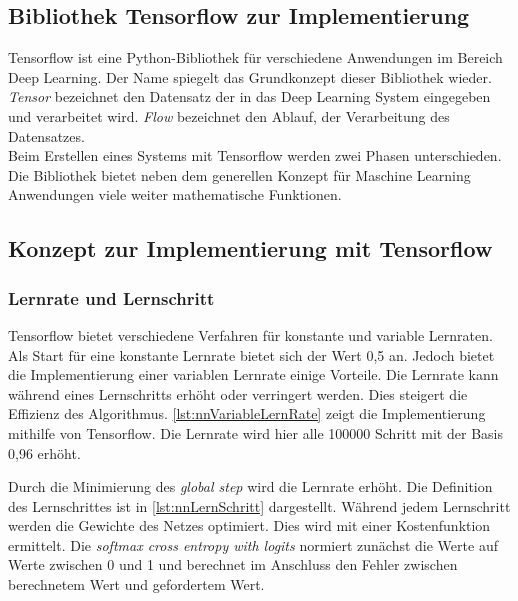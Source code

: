 \subsection{Bibliothek Tensorflow zur Implementierung}
Tensorflow ist eine Python-Bibliothek für verschiedene Anwendungen im Bereich Deep Learning. 
Der Name spiegelt das Grundkonzept dieser Bibliothek wieder. 
\textit{Tensor} bezeichnet den Datensatz der in das Deep Learning System 
eingegeben und verarbeitet wird. \textit{Flow} bezeichnet den Ablauf, 
der Verarbeitung des Datensatzes. \\
Beim Erstellen eines Systems mit Tensorflow werden zwei Phasen 
unterschieden. 
Die Bibliothek bietet neben dem generellen Konzept für Maschine Learning Anwendungen 
viele weiter mathematische Funktionen. 
\cite{tf:2018}

\subsection{Konzept zur Implementierung mit Tensorflow}
\subsubsection{Lernrate und Lernschritt}
Tensorflow bietet verschiedene Verfahren für konstante und variable Lernraten. 
Als Start für eine konstante Lernrate bietet sich der Wert 0,5 an. Jedoch bietet 
die Implementierung einer variablen Lernrate einige Vorteile. Die Lernrate kann während 
eines Lernschritts erhöht oder verringert werden. Dies steigert die Effizienz des Algorithmus. 
\autoref{lst:nnVariableLernRate} zeigt die Implementierung mithilfe von Tensorflow. 
Die Lernrate wird hier alle 100000 Schritt mit der Basis 0,96 erhöht. 



Durch die Minimierung des \textit{global step} wird die Lernrate erhöht. 
Die Definition des Lernschrittes ist in \autoref{lst:nnLernSchritt} dargestellt.
Während jedem Lernschritt werden die Gewichte des Netzes optimiert.
Dies wird mit einer Kostenfunktion ermittelt. 
Die \textit{softmax cross entropy with logits} normiert zunächst die Werte auf Werte zwischen 0 und 1 und berechnet im 
Anschluss den Fehler zwischen berechnetem Wert und gefordertem Wert.



